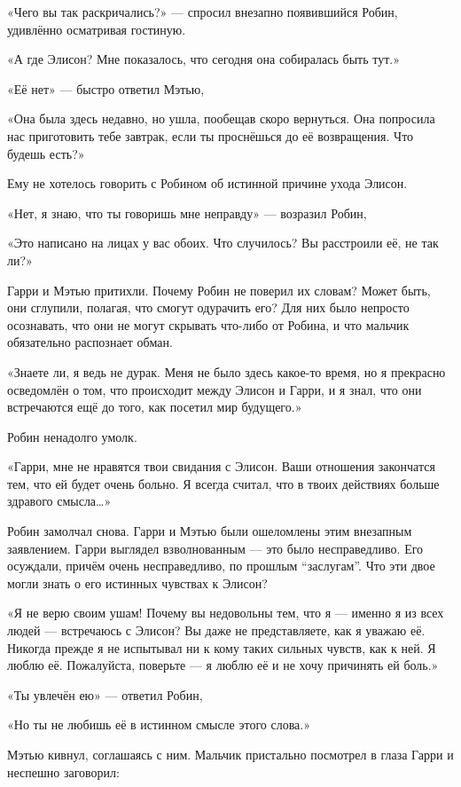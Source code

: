 \documentclass[a5paper, 9pt,
final, openany, twoside=true]{memoir}
\begin{document}
«Чего вы так раскричались?» — спросил внезапно появившийся Робин, удивлённо осматривая гостиную.

«А где Элисон? Мне показалось, что сегодня она собиралась быть тут.»

«Её нет» — быстро ответил Мэтью,

«Она была здесь недавно, но ушла, пообещав скоро вернуться. Она попросила нас приготовить тебе завтрак, если ты проснёшься до её возвращения. Что будешь есть?»

Ему не хотелось говорить с Робином об истинной причине ухода Элисон.

«Нет, я знаю, что ты говоришь мне неправду» — возразил Робин,

«Это написано на лицах у вас обоих. Что случилось? Вы расстроили её, не так ли?»

Гарри и Мэтью притихли. Почему Робин не поверил их словам? Может быть, они сглупили, полагая, что смогут одурачить его? Для них было непросто осознавать, что они не могут скрывать что-либо от Робина, и что мальчик обязательно распознает обман.

«Знаете ли, я ведь не дурак. Меня не было здесь какое-то время, но я прекрасно осведомлён о том, что происходит между Элисон и Гарри, и я знал, что они встречаются ещё до того, как посетил мир будущего.»

Робин ненадолго умолк.

«Гарри, мне не нравятся твои свидания с Элисон. Ваши отношения закончатся тем, что ей будет очень больно. Я всегда считал, что в твоих действиях больше здравого смысла…»

Робин замолчал снова. Гарри и Мэтью были ошеломлены этим внезапным заявлением. Гарри выглядел взволнованным — это было несправедливо. Его осуждали, причём очень несправедливо, по прошлым ``заслугам''. Что эти двое могли знать о его истинных чувствах к Элисон?

«Я не верю своим ушам! Почему вы недовольны тем, что я — именно я из всех людей — встречаюсь с Элисон? Вы даже не представляете, как я уважаю её. Никогда прежде я не испытывал ни к кому таких сильных чувств, как к ней. Я люблю её. Пожалуйста, поверьте — я люблю её и не хочу причинять ей боль.»

«Ты увлечён ею» — ответил Робин,

«Но ты не любишь её в истинном смысле этого слова.»

Мэтью кивнул, соглашаясь с ним. Мальчик пристально посмотрел в глаза Гарри и неспешно заговорил:
\end{document}

